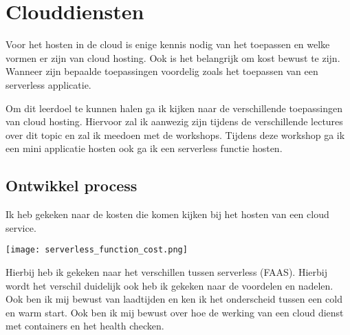 \section{Clouddiensten}\label{sec:clouddiensten}

Voor het hosten in de cloud is enige kennis nodig van het toepassen en welke vormen er zijn van cloud hosting.
Ook is het belangrijk om kost bewust te zijn.
Wanneer zijn bepaalde toepassingen voordelig zoals het toepassen van een serverless applicatie.


Om dit leerdoel te kunnen halen ga ik kijken naar de verschillende toepassingen van cloud hosting.
Hiervoor zal ik aanwezig zijn tijdens de verschillende lectures over dit topic en zal ik meedoen met de workshops.
Tijdens deze workshop ga ik een mini applicatie hosten ook ga ik een serverless functie hosten.

\subsection{Ontwikkel process}
Ik heb gekeken naar de kosten die komen kijken bij het hosten van een cloud service.

\texttt{[image: serverless\_function\_cost.png]}\label{fig:serverless_function_cost}


Hierbij heb ik gekeken naar het verschillen tussen serverless (FAAS).
Hierbij wordt het verschil duidelijk ook heb ik gekeken naar de voordelen en nadelen.
Ook ben ik mij bewust van laadtijden en ken ik het onderscheid tussen een cold en warm start.
Ook ben ik mij bewust over hoe de werking van een cloud dienst met containers en het health checken.

